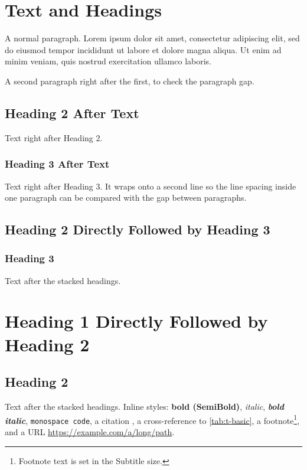 \section{Text and Headings}

A normal paragraph. Lorem ipsum dolor sit amet, consectetur adipiscing elit,
sed do eiusmod tempor incididunt ut labore et dolore magna aliqua. Ut enim ad
minim veniam, quis nostrud exercitation ullamco laboris.

A second paragraph right after the first, to check the paragraph gap.

\subsection{Heading 2 After Text}

Text right after Heading 2.

\subsubsection{Heading 3 After Text}

Text right after Heading 3. It wraps onto a second line so the line spacing
inside one paragraph can be compared with the gap between paragraphs.

\subsection{Heading 2 Directly Followed by Heading 3}
\subsubsection{Heading 3}

Text after the stacked headings.

\section{Heading 1 Directly Followed by Heading 2}
\subsection{Heading 2}

Text after the stacked headings. Inline styles: \textbf{bold (SemiBold)},
\textit{italic}, \textbf{\textit{bold italic}}, \texttt{monospace code},
a citation \cite{example-article}, a cross-reference to \cref{tab:t-basic},
a footnote\footnote{Footnote text is set in the Subtitle size.}, and a URL
\url{https://example.com/a/long/path}.

